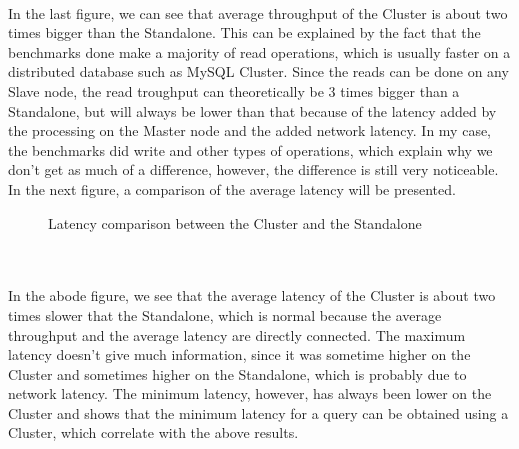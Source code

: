 \paragraph{}In the last figure, we can see that average throughput of the Cluster is about two times bigger than the Standalone. This can be explained by the fact that the benchmarks done make a majority of read operations, which is usually faster on a distributed database such as MySQL Cluster. Since the reads can be done on any Slave node, the read troughput can theoretically be 3 times bigger than a Standalone, but will always be lower than that because of the latency added by the processing on the Master node and the added network latency. In my case, the benchmarks did write and other types of operations, which explain why we don't get as much of a difference, however, the difference is still very noticeable. In the next figure, a comparison of the average latency will be presented.\\

\begin{figure}[htbp]
  \centering
  
  \caption{Latency comparison between the Cluster and the Standalone}
\end{figure}\\

\paragraph{}In the abode figure, we see that the average latency of the Cluster is about two times slower that the Standalone, which is normal because the average throughput and the average latency are directly connected. The maximum latency doesn't give much information, since it was sometime higher on the Cluster and sometimes higher on the Standalone, which is probably due to network latency. The minimum latency, however, has always been lower on the Cluster and shows that the minimum latency for a query can be obtained using a Cluster, which correlate with the above results.